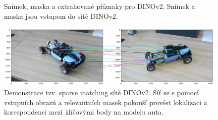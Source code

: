 \begin{figure}[H]
\centering

\newcommand{\subfiguresize}{.15\textwidth}
\newcommand{\imagewidth}{1.0in}
\newcommand{\hspacesize}{.00in}

\newcommand{\insertimage}[1]{%
  \begin{minipage}{\imagewidth}
    \centering
    \texttt{[image: \#1]}
  \end{minipage}
}

\hspace{\hspacesize}%
\hspace{\hspacesize}%
\caption[Snímek, maska a extrahované příznaky pro DINOv2]
{Snímek, maska a extrahované příznaky pro DINOv2. Snímek a maska jsou vstupem do sítě DINOv2. }
\label{fig:dinov2_masks}
\end{figure}

\begin{figure}[H]
\centering
\includegraphics[width=1.0\textwidth,keepaspectratio]{Figures/dinov2demo.png}
\caption[Demonstrace tzv. sparse matching sítě DINOv2]{Demonstrace tzv. sparse matching sítě DINOv2. Síť se s pomocí vstupních obrazů a relevantních masek pokouší provést lokalizaci a korespondenci mezi klíčovými body na modelu auta.}
\label{fig:dinov2_sparse_car_lego}
\end{figure}
\endinput